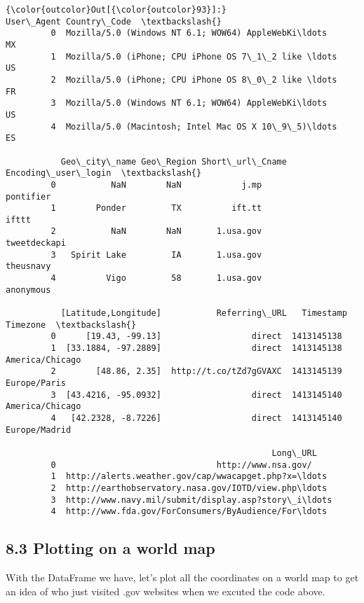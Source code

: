 \documentclass{article}
\begin{document}
            \begin{Verbatim}[commandchars=\\\{\}]
{\color{outcolor}Out[{\color{outcolor}93}]:}                                           User\_Agent Country\_Code  \textbackslash{}
         0  Mozilla/5.0 (Windows NT 6.1; WOW64) AppleWebKi\ldots           MX   
         1  Mozilla/5.0 (iPhone; CPU iPhone OS 7\_1\_2 like \ldots           US   
         2  Mozilla/5.0 (iPhone; CPU iPhone OS 8\_0\_2 like \ldots           FR   
         3  Mozilla/5.0 (Windows NT 6.1; WOW64) AppleWebKi\ldots           US   
         4  Mozilla/5.0 (Macintosh; Intel Mac OS X 10\_9\_5)\ldots           ES   
         
           Geo\_city\_name Geo\_Region Short\_url\_Cname Encoding\_user\_login  \textbackslash{}
         0           NaN        NaN            j.mp           pontifier   
         1        Ponder         TX          ift.tt               ifttt   
         2           NaN        NaN       1.usa.gov        tweetdeckapi   
         3   Spirit Lake         IA       1.usa.gov           theusnavy   
         4          Vigo         58       1.usa.gov           anonymous   
         
           [Latitude,Longitude]           Referring\_URL   Timestamp         Timezone  \textbackslash{}
         0      [19.43, -99.13]                  direct  1413145138                    
         1  [33.1884, -97.2889]                  direct  1413145138  America/Chicago   
         2        [48.86, 2.35]  http://t.co/tZd7gGVAXC  1413145139     Europe/Paris   
         3  [43.4216, -95.0932]                  direct  1413145140  America/Chicago   
         4   [42.2328, -8.7226]                  direct  1413145140    Europe/Madrid   
         
                                                     Long\_URL  
         0                                http://www.nsa.gov/  
         1  http://alerts.weather.gov/cap/wwacapget.php?x=\ldots  
         2  http://earthobservatory.nasa.gov/IOTD/view.php\ldots  
         3  http://www.navy.mil/submit/display.asp?story\_i\ldots  
         4  http://www.fda.gov/ForConsumers/ByAudience/For\ldots  
\end{Verbatim}
        

    \subsection{8.3 Plotting on a world map}


    With the DataFrame we have, let's plot all the coordinates on a world
map to get an idea of who just visited .gov websites when we excuted the
code above.
\end{document}
